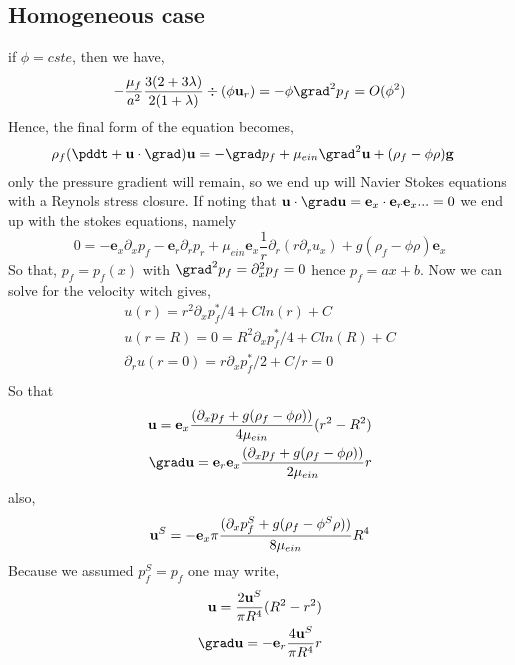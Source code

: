 \subsection{Homogeneous case}
if $\phi = cste$, then we have, 
\begin{equation}
    -
    \frac{\mu_f}{a^2}
    \frac{3(2+3\lambda)}{2(1+\lambda)}\div (\phi\textbf{u}_r)
    =
    - \phi \grad^2 p_f 
    = O(\phi^2)
\end{equation}
Hence, the final form of the equation becomes,
\begin{align}
    \rho_f (\pddt + \textbf{u} \cdot \grad)\textbf{u}
    &= 
    - \grad p_f 
    +\mu_{ein}\grad^2 \textbf{u}
    + (\rho_f - \phi \rho) \textbf{g}
\end{align}
only the pressure gradient will remain, so we end up will Navier Stokes equations with a Reynols stress closure. 
If noting that $\textbf{u}\cdot \grad \textbf{u}= \textbf{e}_x \cdot \textbf{e}_r \textbf{e}_x ... = 0 $ we end up with the stokes equations, namely
\begin{equation}
    0
    = 
    - \textbf{e}_x \partial_x p_f 
    - \textbf{e}_r \partial_r p_r  
    + \mu_{ein} \textbf{e}_x \frac{1}{r}\partial_r (r\partial_r u_x )
    + g (\rho_f - \phi \rho) \textbf{e}_x
\end{equation}
So that, $p_f = p_f(x) $ with $\grad^2 p_f =\partial_x^2 p_f = 0$ hence $p_f = ax+b$.
Now we can solve for the velocity witch gives, 
\begin{align*}
    u(r) = r^2 \partial_x p_f^* /4 + C ln(r) + C\\
    u(r=R) = 0  = R^2 \partial_x p_f^* /4 + C ln(R) + C\\
    \partial_r u(r=0) = r \partial_x p_f^* /2 + C /r = 0\\
\end{align*}
So that 
\begin{align*}
    \textbf{u} = \textbf{e}_x \frac{(\partial_x p_f + g(\rho_f - \phi \rho))}{4\mu_{ein}} (r^2 - R^2)\\
    \grad \textbf{u} = \textbf{e}_r \textbf{e}_x \frac{(\partial_x p_f + g(\rho_f - \phi \rho))}{2\mu_{ein}} r
\end{align*}
also,
\begin{equation}
    \textbf{u}^S = - \textbf{e}_x \pi\frac{(\partial_x p_f^S + g(\rho_f - \phi^S \rho))}{8\mu_{ein}} R^4\\
\end{equation}
Because we assumed $p_f^S = p_f$ one may write, 
\begin{align*}
    \textbf{u} = \frac{2 \textbf{u}^S}{\pi R^4} (R^2 - r^2)\\
    \grad \textbf{u} = - \textbf{e}_r \frac{4 \textbf{u}^S}{\pi R^4} r
\end{align*}

